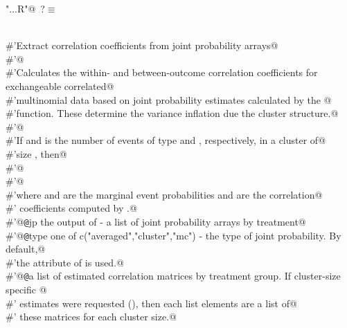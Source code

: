 \documentclass[reqno]{amsart}
\renewcommand{\NWtarget}[2]{\hypertarget{#1}{#2}}
\begin{document}
\begin{flushleft} \small\label{scrap43}\raggedright\small
\NWtarget{nuweb?}{} \verb@"..\R\ExchMultinomial.R"@\nobreak\ {\footnotesize {?}}$\equiv$
\vspace{-1ex}
\begin{list}{}{} \item
\mbox{}\verb@@\\
\mbox{}\verb@#'Extract correlation coefficients from joint probability arrays@\\
\mbox{}\verb@#'@\\
\mbox{}\verb@#'Calculates the within- and between-outcome correlation coefficients for exchangeable correlated@\\
\mbox{}\verb@#'multinomial data based on joint probability estimates calculated by the @\\
\mbox{}\verb@#'function. These determine the variance inflation due the cluster structure.@\\
\mbox{}\verb@#'@\\
\mbox{}\verb@#'If  and  is the number of events of type  and , respectively, in a cluster of@\\
\mbox{}\verb@#'size , then@\\
\mbox{}\verb@#'@\\
\mbox{}\verb@#'@\\
\mbox{}\verb@#'where  and  are the marginal event probabilities and  are the correlation@\\
\mbox{}\verb@#' coefficients computed by .@\\
\mbox{}\verb@#'@{\tt @}\verb@param jp the output of  - a list of joint probability arrays by treatment@\\
\mbox{}\verb@#'@{\tt @}\verb@param type one of c("averaged","cluster","mc") - the type of joint probability. By default,@\\
\mbox{}\verb@#'the  attribute of  is used.@\\
\mbox{}\verb@#'@{\tt @}\verb@return a list of estimated correlation matrices by treatment group. If cluster-size specific @\\
\mbox{}\verb@#' estimates were requested (), then each list elements are a list of@\\
\mbox{}\verb@#' these matrices for each cluster size.@\\

\end{list}
\end{flushleft}
\end{document}
